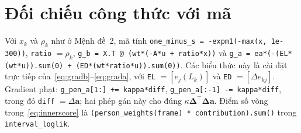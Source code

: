 \documentclass[journal]{IEEEtran}
\newcommand{\code}[1]{\texttt{#1}}
\begin{document}
\section{Đối chiếu công thức với mã}
\raggedright
Với $x_k$ và $\rho_k$ như ở Mệnh đề~2, mã tính \code{one\_minus\_s = -expm1(-max(x, 1e-300))}, \code{ratio} $=\rho_k$, \code{g\_b = X.T @ (wt*(-A*u + ratio*x))} và \code{g\_a = ea*(-(EL*(wt*u)).sum(0) + (ED*(wt*ratio*u)).sum(0))}. Các biểu thức này là cài đặt trực tiếp của~\eqref{eq:gradb}--\eqref{eq:grada}, với \code{EL} $=[e_j(L_k)]$ và \code{ED} $=[\Delta e_{kj}]$. Gradient phạt: \code{g\_pen\_a[1:] += kappa*diff}, \code{g\_pen\_a[:-1] -= kappa*diff}, trong đó \code{diff} $=\Delta\bm a$; hai phép gán này cho đúng $\kappa\bm\Delta^\top\bm\Delta\bm a$. Điểm số vòng trong~\eqref{eq:innerscore} là \code{(person\_weights(frame) * contribution).sum()} trong \code{interval\_loglik}.
\end{document}
